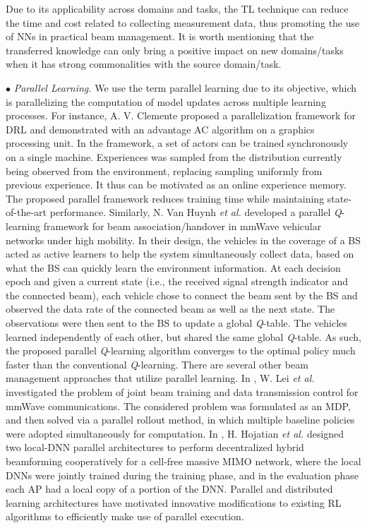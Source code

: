 \documentclass[journal,comsoc]{IEEEtran}
\begin{document}
Due to its applicability across domains and tasks, the TL technique can reduce the time and cost related to collecting measurement data, thus promoting the use of NNs in practical beam management. It is worth mentioning that the transferred knowledge can only bring a positive impact on new domains/tasks when it has strong commonalities with the source domain/task.


$\bullet$ \emph{Parallel Learning.} We use the term parallel learning due to its objective, which is parallelizing the computation of model updates across multiple learning processes. For instance, A. V. Clemente \cite{Efficient-Parallel-Methods-2017} proposed a parallelization framework for DRL and demonstrated with an advantage AC algorithm on a graphics processing unit. In the framework, a set of actors can be trained synchronously on a single machine. Experiences was sampled from the distribution currently being observed from the environment, replacing sampling uniformly from previous experience. It thus can be motivated as an online experience memory. The proposed parallel framework reduces training time while maintaining state-of-the-art performance. Similarly, N. Van Huynh \emph{et al.} \cite{Optimal-Beam-Association-High-Mobility-2021} developed a parallel \emph{Q}-learning framework for beam association/handover in mmWave vehicular networks under high mobility. In their design, the vehicles in the coverage of a BS acted as active learners to help the system simultaneously collect data, based on what the BS can quickly learn the environment information. At each decision epoch and given a current state (i.e., the received signal strength indicator and the connected beam), each vehicle chose to connect the beam sent by the BS and observed the data rate of the connected beam as well as the next state. The observations were then sent to the BS to update a global \emph{Q}-table. The vehicles learned independently of each other, but shared the same global \emph{Q}-table. As such, the proposed parallel \emph{Q}-learning algorithm converges to the optimal policy much faster than the conventional \emph{Q}-learning. There are several other beam management approaches that utilize parallel learning. In \cite{Joint-Beam-Training-Data-Transmission-Control-2022}, W. Lei \emph{et al.} investigated the problem of joint beam training and data transmission control for mmWave communications. The considered problem was formulated as an MDP, and then solved via a parallel rollout method, in which multiple baseline policies were adopted simultaneously for computation. In \cite{Decentralized-Beamforming-Cell-Free-Massive-MIMO-2022}, H. Hojatian \emph{et al.} designed two local-DNN parallel architectures to perform decentralized hybrid beamforming cooperatively for a cell-free massive MIMO network, where the local DNNs were jointly trained during the training phase, and in the evaluation phase each AP had a local copy of a portion of the DNN. Parallel and distributed learning architectures have motivated innovative modifications to existing RL algorithms to efficiently make use of parallel execution.
\end{document}

